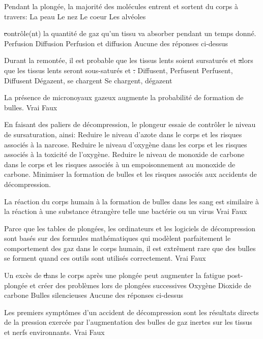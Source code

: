 \documentclass[english,10pt,a4paper,twoside]{article}
\begin{document}
	\begin{outline}
		\1  Pendant la plongée, la majorité des molécules entrent et sortent du corps à travers:
			\2 La peau
			\2 Le nez
			\2 Le coeur
			\2 Les alvéoles

		\1 \st contrôle(nt) la quantité de gaz qu'un tissu va absorber pendant un temps donné.
			\2 Perfusion
			\2 Diffusion
			\2 Perfusion et diffusion
			\2 Aucune des réponses ci-dessus

		\1 Durant la remontée, il est probable que les tissus lents soient sursaturés et \st alors que les tissus lents seront sous-saturés et \st.
			\2 Diffusent, Perfusent
			\2 Perfusent, Diffusent
			\2 Dégazent, se chargent
			\2 Se chargent, dégazent

		\1 La présence de micronoyaux gazeux augmente la probabilité de formation de bulles.
			\2 Vrai
			\2 Faux

		\1 En faisant des paliers de décompression, le plongeur essaie de contrôler le niveau de sursaturation, ainsi:
			\2 Reduire le niveau d'azote dans le corps et les risques associés à la narcose.
			\2 Reduire le niveau d'oxygène dans les corps et les risques associés à la toxicité de l'oxygène.
			\2 Reduire le niveau de monoxide de carbone dans le corps et les risques associés à un empoisonnement au monoxide de carbone.
			\2 Minimiser la formation de bulles et les risques associés aux accidents de décompression.

		\1 La réaction du corps humain à la formation de bulles dans les sang est similaire à la réaction à une substance étrangère telle une bactérie ou un virus
			\2 Vrai
			\2 Faux

		\1 Parce que les tables de plongées, les ordinateurs et les logiciels de décompression sont basés sur des formules mathématiques qui modèlent parfaitement le comportement des gaz dans le corps humain, il est extrêment rare que des bulles se forment quand ces outils sont utilisés correctement.
			\2 Vrai
			\2 Faux

		\1 Un excès de \st dans le corps après une plongée peut augmenter la fatigue post-plongée et créer des problèmes lors de plongées successives
			\2 Oxygène
			\2 Dioxide de carbone
			\2 Bulles silencieuses
			\2 Aucune des réponses ci-dessus

		\1 Les premiers symptômes d'un accident de décompression sont les résultats directs de la pression exercée par l'augmentation des bulles de gaz inertes sur les tissus et nerfs environnants.
			\2 Vrai
			\2 Faux
		

\end{outline}
\end{document}
